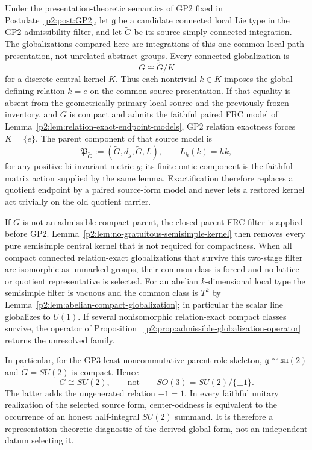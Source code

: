 \documentclass[12pt,a4paper]{article}
\begin{document}
\begin{theorem}
\label{p2:thm:relation-minimal-globalization}
Under the presentation-theoretic semantics of GP2 fixed in
Postulate~\ref{p2:post:GP2}, let \(\mathfrak g\) be a candidate connected
local Lie type in the GP2-admissibility filter, and let \(\widetilde G\) be
its source-simply-connected integration.  The globalizations compared here
are integrations of this one common local path presentation, not unrelated
abstract groups.  Every connected globalization is
\[
 G\cong\widetilde G/K
\]
for a discrete central kernel \(K\).  Thus each nontrivial \(k\in K\)
imposes the global defining relation \(k=e\) on the common source
presentation.  If that equality is absent from the geometrically primary
local source and the previously frozen inventory, and
\(\widetilde G\) is compact and admits the faithful paired FRC model of
Lemma~\ref{p2:lem:relation-exact-endpoint-models}, GP2 relation exactness
forces \(K=\{e\}\).  The parent component of that source model is
\[
 \mathfrak P_{\widetilde G}
 :=(\widetilde G,d_g,\widetilde G,L),
 \qquad L_h(k)=hk,
\]
for any positive bi-invariant metric \(g\); its finite ontic component is the
faithful matrix action supplied by the same lemma.  Exactification therefore
replaces a quotient endpoint by a paired source-form model and never lets a
restored kernel act trivially on the old quotient carrier.

If \(\widetilde G\) is not an admissible compact parent, the closed-parent FRC
filter is applied before GP2.  Lemma~\ref{p2:lem:no-gratuitous-semisimple-kernel}
then removes every pure semisimple central kernel that is not required for
compactness.  When all compact connected relation-exact globalizations that
survive this two-stage filter are isomorphic as unmarked groups, their common
class is forced and no lattice or quotient representative is selected.  For
an abelian \(k\)-dimensional local type the semisimple filter is vacuous and
the common class is \(T^k\) by
Lemma~\ref{p2:lem:abelian-compact-globalization}; in particular the scalar
line globalizes to \(U(1)\).  If several nonisomorphic relation-exact compact
classes survive, the operator of Proposition~
\ref{p2:prop:admissible-globalization-operator} returns the unresolved family.

In particular, for the GP3-least noncommutative parent-role skeleton,
\(\mathfrak g\cong\mathfrak{su}(2)\) and \(\widetilde G=SU(2)\) is compact.
Hence
\[
        G\cong SU(2),\qquad\text{not}\qquad
        SO(3)=SU(2)/\{\pm1\}.
\]
The latter adds the ungenerated relation \(-1=1\).  In every faithful unitary
realization of the selected source form, center-oddness is equivalent to the
occurrence of an honest half-integral \(SU(2)\) summand.  It is therefore a
representation-theoretic diagnostic of the derived global form, not an
independent datum selecting it.
\end{theorem}
\end{document}

